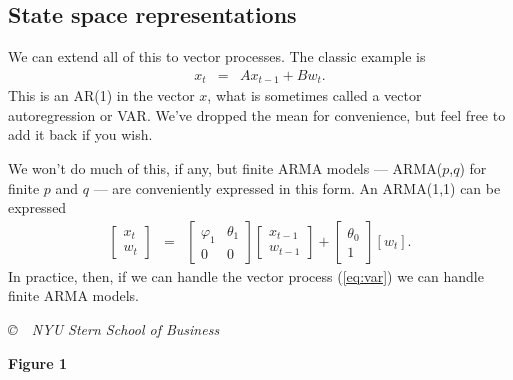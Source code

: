 \documentclass[11pt]{article}
\begin{document}
\subsection*{State space representations}


We can extend all of this to vector processes.
The classic example is
\begin{eqnarray}
    x_{t} &=& A x_{t-1} + B w_{t} .
    \label{eq:var}
\end{eqnarray}
This is an AR(1) in the vector $x$,
what is sometimes called a vector autoregression or VAR.
We've dropped the mean for convenience, but feel free to add it back
if you wish.

We won't do much of this, if any,
but finite ARMA models ---
ARMA($p$,$q$) for finite $p$ and $q$ ---
are conveniently expressed in this form.
An ARMA(1,1) can be expressed
\begin{eqnarray*}
    \left[
    \begin{array}{c}
    x_t \\ w_t
    \end{array}
    \right]
    &=&
    \left[
    \begin{array}{cc}
    \varphi_1 & \theta_1 \\ 0 & 0
    \end{array}
    \right]
    \left[
    \begin{array}{c}
    x_{t-1} \\ w_{t-1}
    \end{array}
    \right]
    +
    \left[
    \begin{array}{c}
    \theta_0 \\ 1
    \end{array}
    \right]
    [w_t ] .
\end{eqnarray*}
In practice, then,
if we can handle the vector process (\ref{eq:var})
we can handle finite ARMA models.


\vfill \centerline{\it \copyright \ \number\year \
NYU Stern School of Business}


\pagebreak
{\large\bf Figure 1}
\end{document}
